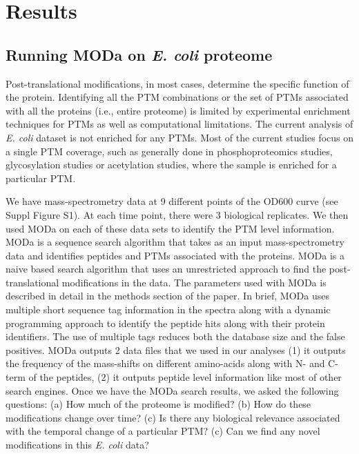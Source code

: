 \documentclass[12pt]{article}
\begin{document}
\section{Results}

\subsection{Running MODa on \emph{E. coli} proteome}
Post-translational modifications, in most cases, determine the specific function of the protein. Identifying all the PTM combinations or the set of PTMs associated with all the proteins (i.e., entire proteome) is limited by experimental enrichment techniques for PTMs as well as computational limitations. The current analysis of \emph{E. coli} dataset is not enriched for any PTMs.  Most of the current studies focus on a single PTM coverage, such as generally done in phosphoproteomics studies, glycosylation studies or acetylation studies, where the sample is enriched for a particular PTM. 

We have mass-spectrometry data at 9 different points of the OD600 curve (see Suppl Figure S1). At each time point, there were 3 biological replicates. We then used MODa on each of these data sets to identify the PTM level information. MODa is a sequence search algorithm that takes as an input mass-spectrometry data and identifies peptides and PTMs associated with the proteins. MODa is a naive based search algorithm that uses an unrestricted approach to find the post-translational modifications in the data. The parameters used with MODa is described in detail in the methods section of the paper. In brief, MODa uses multiple short sequence tag information in the spectra along with a dynamic programming approach to identify the peptide hits along with their protein identifiers. The use of multiple tags reduces both the database size and the false positives. MODa outputs 2 data files that we used in our analyses (1) it outputs the frequency of the mass-shifts on different amino-acids along with N- and C- term of the peptides, (2) it outputs peptide level information like most of other search engines. Once we have the MODa search results, we asked the following questions: (a) How much of the proteome is modified? (b) How do these modifications change over time? (c) Is there any biological relevance associated with the temporal change of a particular PTM? (c) Can we find any novel modifications in this \emph{E. coli} data? 
\end{document}

